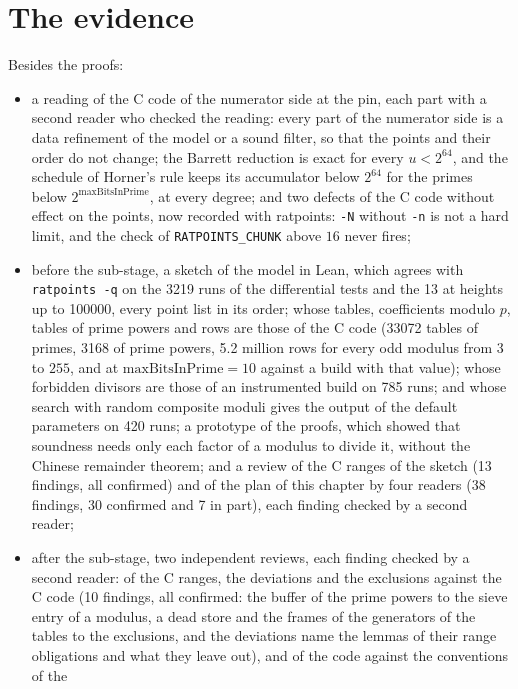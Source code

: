 \section{The evidence}\label{sec:tables-evidence}

Besides the proofs:
\begin{itemize}
  \item a reading of the C code of the numerator side at the pin, each part with a second reader who
    checked the reading: every part of the numerator side is a data refinement of the model or a
    sound filter, so that the points and their order do not change; the Barrett reduction is exact
    for every $u < 2^{64}$, and the schedule of Horner's rule keeps its accumulator below $2^{64}$
    for the primes below $2^{\mathrm{maxBitsInPrime}}$, at every degree; and two defects of the C
    code without effect on the points, now recorded with ratpoints: \verb|-N| without \verb|-n| is
    not a hard limit, and the check of \verb|RATPOINTS_CHUNK| above $16$ never fires;
  \item before the sub-stage, a sketch of the model in Lean, which agrees with \verb|ratpoints -q|
    on the 3219 runs of the differential tests and the 13 at heights up to 100000, every point list
    in its order; whose tables, coefficients modulo $p$, tables of prime powers and rows are those
    of the C code (33072 tables of primes, 3168 of prime powers, 5.2 million rows for every odd
    modulus from $3$ to $255$, and at $\mathrm{maxBitsInPrime} = 10$ against a build with that
    value); whose forbidden divisors are those of an instrumented build on 785 runs; and whose
    search with random composite moduli gives the output of the default parameters on 420 runs; a
    prototype of the proofs, which showed that soundness needs only each factor of a modulus to
    divide it, without the Chinese remainder theorem; and a review of the C ranges of the sketch (13
    findings, all confirmed) and of the plan of this chapter by four readers (38 findings, 30
    confirmed and 7 in part), each finding checked by a second reader;
  \item after the sub-stage, two independent reviews, each finding checked by a second reader: of
    the C ranges, the deviations and the exclusions against the C code (10 findings, all confirmed:
    the buffer of the prime powers to the sieve entry of a modulus, a dead store and the frames of
    the generators of the tables to the exclusions, and the deviations name the lemmas of their
    range obligations and what they leave out), and of the code against the conventions of the

\end{itemize}
